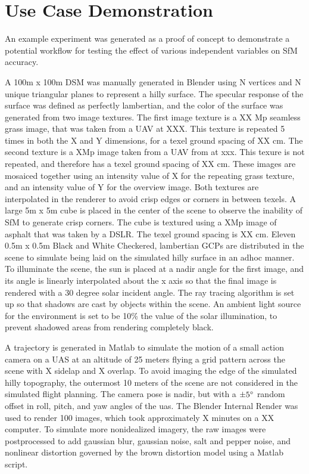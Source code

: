 \section{Use Case Demonstration}

An example experiment was generated as a proof of concept to demonstrate a potential workflow for testing the effect of various independent variables on SfM accuracy.  


A 100m x 100m DSM was manually generated in Blender using N vertices and N unique triangular planes to represent a hilly surface.  The specular response of the surface was defined as perfectly lambertian, and the color of the surface was generated from two image textures.  The first image texture is a XX Mp seamless grass image, that was taken from a UAV at XXX.  This texture is repeated 5 times in both the X and Y dimensions, for a texel ground spacing of XX cm.  The second texture is a XMp image taken from a UAV from at xxx.  This texure is not repeated, and therefore has a texel ground spacing of XX cm.  These images are mosaiced together using an intensity value of X for the repeating grass texture, and an intensity value of Y for the overview image.  Both textures are interpolated in the renderer to avoid crisp edges or corners in between texels.  A large 5m x 5m cube is placed in the center of the scene to observe the inability of SfM to generate crisp corners.  The cube is textured using a XMp image of asphalt that was taken by a DSLR.  The texel ground spacing is XX cm.  Eleven 0.5m x 0.5m Black and White Checkered, lambertian GCPs are distributed in the scene to simulate being laid on the simulated hilly surface in an adhoc manner.  To illuminate the scene, the sun is placed at a nadir angle for the first image, and its angle is linearly interpolated about the x axis so that the final image is rendered with a 30 degree solar incident angle.  The ray tracing algorithm is set up so that shadows are cast by objects within the scene.  An ambient light source for the environment is set to be 10\% the value of the solar illumination, to prevent shadowed areas from rendering completely black.  

A trajectory is generated in Matlab to simulate the motion of a small action camera on a UAS at an altitude of 25 meters flying a grid pattern across the scene with X sidelap and X overlap.  To avoid imaging the edge of the simulated hilly topography, the outermost 10 meters of the scene are not considered in the simulated flight planning.  The camera pose is nadir, but with a $\pm 5 \degree$ random offset in roll, pitch, and yaw angles of the uas.  The Blender Internal Render was used to render 100 images, which took approximately X minutes on a XX computer.  To simulate more nonidealized imagery, the raw images were postprocessed to add gaussian blur, gaussian noise, salt and pepper noise, and nonlinear distortion governed by the brown distortion model using a Matlab script.

